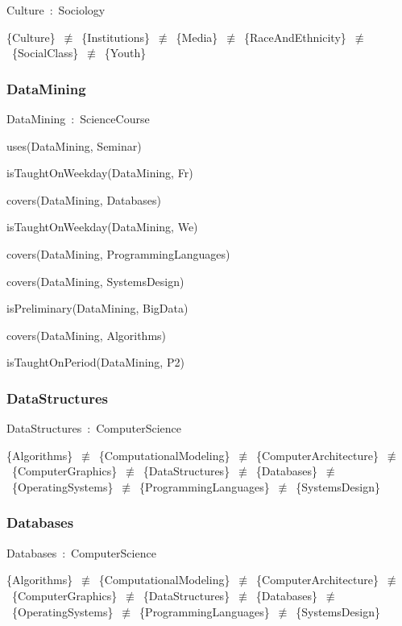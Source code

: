 \documentclass{article}
\begin{document}
Culture~:~Sociology

\{Culture\}~\ensuremath{\not\equiv}~\{Institutions\}~\ensuremath{\not\equiv}~\{Media\}~\ensuremath{\not\equiv}~\{RaceAndEthnicity\}~\ensuremath{\not\equiv}~\{SocialClass\}~\ensuremath{\not\equiv}~\{Youth\}

\subsubsection*{DataMining}

DataMining~:~ScienceCourse

uses(DataMining, Seminar)

isTaughtOnWeekday(DataMining, Fr)

covers(DataMining, Databases)

isTaughtOnWeekday(DataMining, We)

covers(DataMining, ProgrammingLanguages)

covers(DataMining, SystemsDesign)

isPreliminary(DataMining, BigData)

covers(DataMining, Algorithms)

isTaughtOnPeriod(DataMining, P2)

\subsubsection*{DataStructures}

DataStructures~:~ComputerScience

\{Algorithms\}~\ensuremath{\not\equiv}~\{ComputationalModeling\}~\ensuremath{\not\equiv}~\{ComputerArchitecture\}~\ensuremath{\not\equiv}~\{ComputerGraphics\}~\ensuremath{\not\equiv}~\{DataStructures\}~\ensuremath{\not\equiv}~\{Databases\}~\ensuremath{\not\equiv}~\{OperatingSystems\}~\ensuremath{\not\equiv}~\{ProgrammingLanguages\}~\ensuremath{\not\equiv}~\{SystemsDesign\}

\subsubsection*{Databases}

Databases~:~ComputerScience

\{Algorithms\}~\ensuremath{\not\equiv}~\{ComputationalModeling\}~\ensuremath{\not\equiv}~\{ComputerArchitecture\}~\ensuremath{\not\equiv}~\{ComputerGraphics\}~\ensuremath{\not\equiv}~\{DataStructures\}~\ensuremath{\not\equiv}~\{Databases\}~\ensuremath{\not\equiv}~\{OperatingSystems\}~\ensuremath{\not\equiv}~\{ProgrammingLanguages\}~\ensuremath{\not\equiv}~\{SystemsDesign\}
\end{document}
